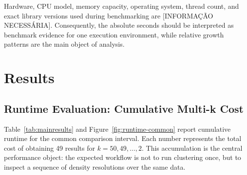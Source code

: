 \documentclass[11pt]{article}
\begin{document}
Hardware, CPU model, memory capacity, operating system, thread count, and exact library versions used during benchmarking are [INFORMAÇÃO NECESSÁRIA]. Consequently, the absolute seconds should be interpreted as benchmark evidence for one execution environment, while relative growth patterns are the main object of analysis.

\section{Results}

\subsection{Runtime Evaluation: Cumulative Multi-k Cost}

Table~\ref{tab:mainresults} and Figure~\ref{fig:runtime-common} report cumulative runtime for the common comparison interval. Each number represents the total cost of obtaining 49 results for \(k=50,49,\ldots,2\). This accumulation is the central performance object: the expected workflow is not to run clustering once, but to inspect a sequence of density resolutions over the same data.

\begin{table}[t]
\centering
\caption{Cumulative runtime in seconds for the 49-value multi-\(k\) workflow. Values are means with cumulative standard deviations aggregated from 30 timing repetitions for each requested \(k\).}
\label{tab:mainresults}
\end{table}
\end{document}

